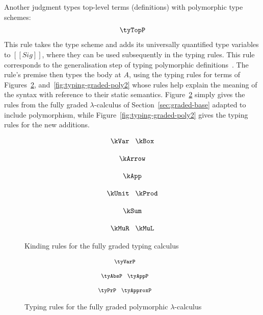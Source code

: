 Another judgment types top-level terms (definitions) with polymorphic type
schemes:
\begin{align*}
\tyTopP
\end{align*}
This rule takes the type scheme and adds its universally quantified type
variables to $[[ Sig ]]$, where they can be used subsequently in the typing
rules. This rule corresponds to the generalisation step of typing polymorphic
definitions~\citep{milner1978theory}. The rule's premise then types the body at
$A$, using the typing rules for terms of Figures~\ref{fig:typing-graded-poly1},
and~\ref{fig:typing-graded-poly2} whose rules help explain the meaning of the
syntax with reference to their static semantics. Figure~\ref{fig:typing-graded-poly1} 
simply gives the rules from the fully graded $\lambda$-calculus of Section~\ref{sec:graded-base}
adapted to include polymorphism, while Figure~\ref{fig:typing-graded-poly2} gives the
typing rules for the new additions.
\begin{figure}[t]
    \begin{align*}
      {{
    \hspace{0em}\begin{array}{c}
        \kVar 
        \;\;\;
        \kBox 
        \\[1.25em]
        \kArrow
        \\[1.25em]
        \kApp 
        \\[1.25em]
        \kUnit
        \;\;\;
        \kProd 
        \\[1.25em]
        \kSum
        \\[1.25em]
        \kMuR
        \;\;\;
        \kMuL
    \end{array}
      }}
    \end{align*}
    \caption{Kinding rules for the fully graded typing calculus}
    \label{figure:kinding}
\end{figure}

\begin{figure}[t]
    \begin{align*}
    {\footnotesize{
    \hspace{-2.5em}
    \begin{array}{c}
    \tyVarP
    \\[1.25em]
    \tyAbsP
    \;\;\;
    \tyAppP
        \\[1.25em]
    \tyPrP
    \;\;\;
    \tyApproxP
    \end{array}
    }}
    \end{align*}
    \vspace{-1em}
    \caption{Typing rules for the fully graded polymorphic $\lambda$-calculus}
    \label{fig:typing-graded-poly1}
    \vspace{-0.5em}
\end{figure}

